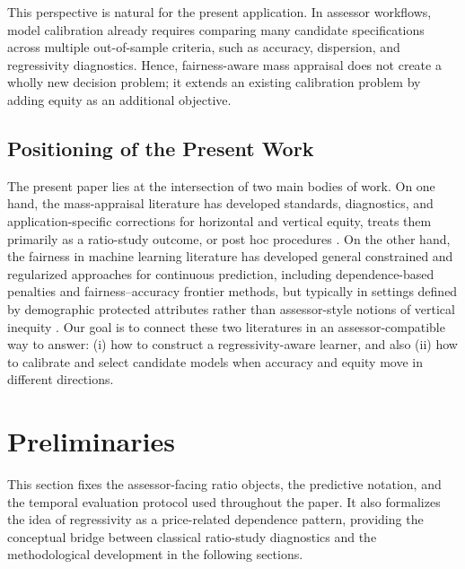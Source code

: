 \documentclass[12pt, draft]{article}
\theoremstyle{plain}
\theoremstyle{definition}
\newcommand{\1}{\mathbf{1}}
\begin{document}
This perspective is natural for the present application. In assessor workflows, model calibration already requires comparing many candidate specifications across multiple out-of-sample criteria, such as accuracy, dispersion, and regressivity diagnostics. Hence, fairness-aware mass appraisal does not create a wholly new decision problem; it extends an existing calibration problem by adding equity as an additional objective.


\subsection{Positioning of the Present Work}

 
The present paper lies at the intersection of two main bodies of work. On one hand, the mass-appraisal literature has developed standards, diagnostics, and application-specific corrections for horizontal and vertical equity, treats them primarily as a ratio-study outcome, or post hoc procedures \cite{Quintos2014,IAAO2023VerticalReview,BidansetEtAl2019,CandoganHanLu2023}. On the other hand, the fairness in machine learning literature has developed general constrained and regularized approaches for continuous prediction, including dependence-based penalties and fairness--accuracy frontier methods, but typically in settings defined by demographic protected attributes rather than assessor-style notions of vertical inequity \cite{AgarwalDudikWu2019,LiEtAl2022Fairness,lee2022maximal,martinez2020minimax,little2022fairness}. Our goal is to connect these two literatures in an assessor-compatible way to answer: (i) how to construct a regressivity-aware learner, and also (ii) how to calibrate and select candidate models when accuracy and equity move in different directions. 


\section{Preliminaries}
\label{sec:problem_setting}

This section fixes the assessor-facing ratio objects, the predictive notation, and the temporal evaluation protocol used throughout the paper. It also formalizes the idea of regressivity as a price-related dependence pattern, providing the conceptual bridge between classical ratio-study diagnostics and the methodological development in the following sections.
\end{document}
